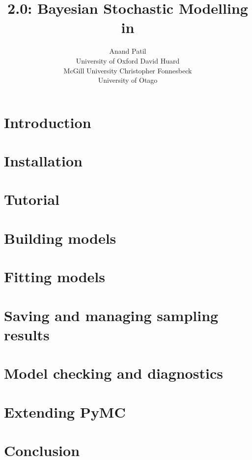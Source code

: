 \documentclass[]{jss_mod}
\author{Anand Patil\\University of Oxford \And 
        David Huard\\McGill University  \And
		Christopher Fonnesbeck\\University of Otago}
\title{\pkg{PyMC} 2.0: Bayesian Stochastic Modelling in \proglang{Python}}
\begin{document}

\section[Introduction]{Introduction} 
\label{sec:intro} 


\section[Installation]{Installation} 
\label{sec:install} 


\section[Tutorial]{Tutorial}
\label{sec:tutorial}


\section[Building Models]{Building models}
\label{sec:modelbuilding} 


\section[Fitting Models]{Fitting models}
\label{sec:modelfitting}


\section[Sampling Results]{Saving and managing sampling results}
\label{sec:database} 


\section[Model Checking]{Model checking and diagnostics} 
\label{sec:modelchecking}


\section[Extending PyMC]{Extending PyMC}
\label{sec:extending}


\section{Conclusion}
\label{conclusion}

\end{document}
